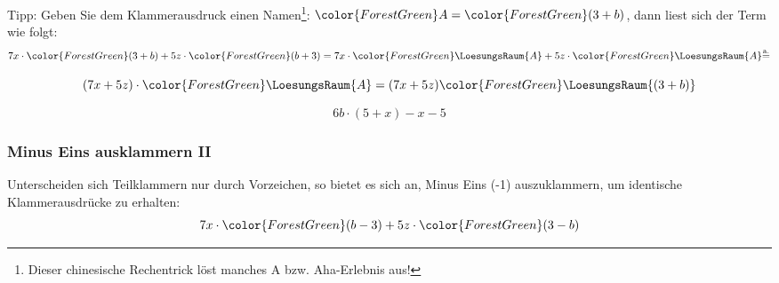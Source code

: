 Tipp: Geben Sie dem Klammerausdruck einen Namen\footnote{Dieser
chinesische Rechentrick löst manches {\color{ForestGreen}A} bzw. {\color{ForestGreen}Aha}-Erlebnis aus!}: ${\color{ForestGreen}A} = {\color{ForestGreen}(3+b)}$, dann liest sich der
Term wie folgt:
$$7x\cdot{}{\color{ForestGreen}(3+b)} + 5z\cdot{}{\color{ForestGreen}(b+3)} = 7x\cdot{\color{ForestGreen}\LoesungsRaum{A}}
+ 5z\cdot{\color{ForestGreen}\LoesungsRaum{A}} {\stackrel{\text{a.}}{=}}$$

$$(7x+5z)\cdot{\color{ForestGreen}\LoesungsRaum{A}} = (7x+5z){\color{ForestGreen}\LoesungsRaum{(3+b)}}$$

\begin{beispiel}{}{}
$$6b\cdot{}(5+x) - x- 5$$

\end{beispiel}






\newpage



\subsubsection{Minus Eins ausklammern II}
Unterscheiden sich Teilklammern nur durch Vorzeichen, so bietet es
sich an, Minus Eins (-1) auszuklammern, um identische Klammerausdrücke
zu erhalten:
$$7x\cdot{}{\color{ForestGreen}(b-3)} + 5z\cdot{}{\color{ForestGreen}(3-b)}$$%





